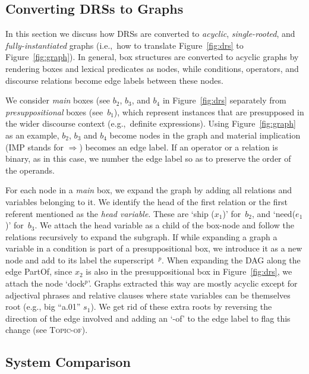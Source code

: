 \documentclass[11pt,a4paper]{article}
\theoremstyle{plain}
\begin{document}
\subsection{Converting DRSs to Graphs}
\label{sec:conv-drss-graphs}

In this section we discuss how DRSs are converted to \textit{acyclic}, \textit{single-rooted}, and \textit{fully-instantiated} graphs (i.e.,~how to translate Figure~\ref{fig:drs} to Figure~\ref{fig:graph}). In general, box structures are converted
to acyclic graphs by rendering boxes and lexical predicates as nodes, 
while conditions, operators, and discourse relations become edge
labels between these nodes.

We consider \textit{main} boxes (see $b_2$, $b_3$, and $b_4$ in
Figure~\ref{fig:drs} separately from \textit{presuppositional} boxes
(see~$b_1$), which represent instances that are presupposed in the
wider discourse context (e.g.,~definite expressions). Using
Figure~\ref{fig:graph} as an example, $b_2$, $b_3$ and $b_4$ become nodes in the graph and material implication (IMP stands for
$\Rightarrow$) becomes an edge label. If an operator or a relation is
binary, as in this case, we number the edge label so as to preserve
the order of the operands.

For each node in a \textit{main} box, we expand the graph by adding
all relations and variables belonging to it. We identify the head of
the first relation or the first referent mentioned as the \textit{head variable}. These are `ship ($x_1$)' for~$b_2$, and `need($e_1$)'
for~$b_3$. We attach the head variable as a child of the box-node and
follow the relations recursively to expand the subgraph. If
while expanding a graph a variable in a condition is part of a
presuppositional box, we introduce it as a new node and add to its
label the superscript~$^p$. When expanding the DAG along the edge
{PartOf}, since $x_2$ is also in the presuppositional box in
Figure~\ref{fig:drs}, we attach the node `dock$^p$'.  Graphs
extracted this way are mostly acyclic except for adjectival phrases
and relative clauses where state variables can be themselves root
(e.g., big ``a.01'' $s_1$). We get rid of these extra roots by
reversing the direction of the edge involved and adding an `-of' to
the edge label to flag this change (see \textsc{Topic-of}).

\subsection{System Comparison}
\label{sec:systems-experiments}
\end{document}
